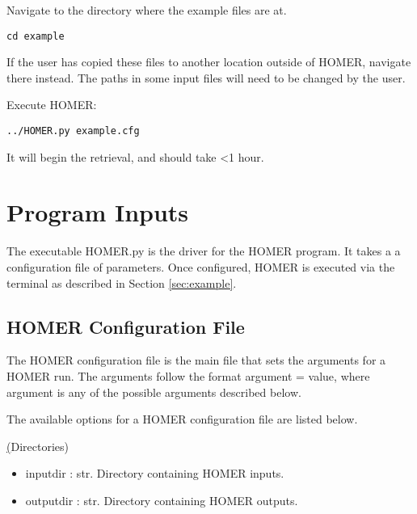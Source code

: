 \documentclass[letterpaper, 12pt]{article}
\begin{document}
\noindent Navigate to the directory where the example files are at.
\begin{verbatim}
cd example
\end{verbatim}
If the user has copied these files to another location outside of HOMER, 
navigate there instead.  The paths in some input files will need to be changed 
by the user. \newline

\noindent Execute HOMER:
\begin{verbatim}
../HOMER.py example.cfg
\end{verbatim}

\noindent It will begin the retrieval, and should take \textless 1 hour.



\section{Program Inputs}
\label{sec:inputs}

The executable HOMER.py is the driver for the HOMER program. It takes a 
a configuration file of parameters.  Once configured, HOMER is executed via 
the terminal as described in Section \ref{sec:example}.


\subsection{HOMER Configuration File}
\label{sec:config}
The HOMER configuration file is the main file that sets the arguments for a 
HOMER run. The arguments follow the format {\ttb argument = value}, where 
{\ttb argument} is any of the possible arguments described below. 

\noindent The available options for a HOMER configuration file are listed below.

\noindent \underline(Directories)
\begin{itemize}
\item inputdir   : str.  Directory containing HOMER inputs.
\item outputdir  : str.  Directory containing HOMER outputs.
\end{itemize}
\end{document}
